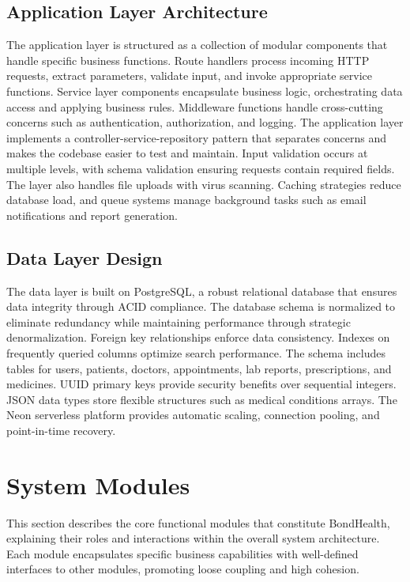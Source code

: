 \subsection{Application Layer Architecture}

\justifying
\noindent The application layer is structured as a collection of modular components that handle specific business functions. Route handlers process incoming HTTP requests, extract parameters, validate input, and invoke appropriate service functions. Service layer components encapsulate business logic, orchestrating data access and applying business rules. Middleware functions handle cross-cutting concerns such as authentication, authorization, and logging. The application layer implements a controller-service-repository pattern that separates concerns and makes the codebase easier to test and maintain. Input validation occurs at multiple levels, with schema validation ensuring requests contain required fields. The layer also handles file uploads with virus scanning. Caching strategies reduce database load, and queue systems manage background tasks such as email notifications and report generation.

\subsection{Data Layer Design}

\justifying
\noindent The data layer is built on PostgreSQL, a robust relational database that ensures data integrity through ACID compliance. The database schema is normalized to eliminate redundancy while maintaining performance through strategic denormalization. Foreign key relationships enforce data consistency. Indexes on frequently queried columns optimize search performance. The schema includes tables for users, patients, doctors, appointments, lab reports, prescriptions, and medicines. UUID primary keys provide security benefits over sequential integers. JSON data types store flexible structures such as medical conditions arrays. The Neon serverless platform provides automatic scaling, connection pooling, and point-in-time recovery.

\section{System Modules}

\justifying
\noindent This section describes the core functional modules that constitute BondHealth, explaining their roles and interactions within the overall system architecture. Each module encapsulates specific business capabilities with well-defined interfaces to other modules, promoting loose coupling and high cohesion.


